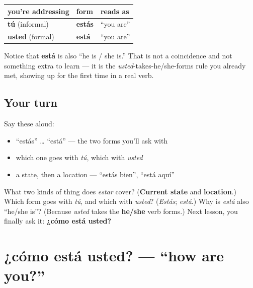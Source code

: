 \begin{grammarlens}[title={Grammar Lens: the two forms you need}]
\noindent
\begin{tabularx}{\linewidth}{@{}>{\raggedright\arraybackslash}X>{\raggedright\arraybackslash}X>{\raggedright\arraybackslash}X@{}}
\toprule
\textbf{you're addressing} & \textbf{form} & \textbf{reads as} \\
\midrule
\textbf{tú} (informal) & \textbf{estás} & \textquotedblleft{}you are\textquotedblright{} \\
\textbf{usted} (formal) & \textbf{está} & \textquotedblleft{}you are\textquotedblright{} \\
\bottomrule
\end{tabularx}

Notice that \textbf{está} is also \textquotedblleft{}he is / she is.\textquotedblright{} That is not a coincidence and not something extra to learn — it is the \emph{usted}-takes-he/she-forms rule you already met, showing up for the first time in a real verb.
\end{grammarlens}

\subsection*{Your turn}
Say these aloud:

\begin{itemize}
\raggedright
  \item \textquotedblleft{}estás\textquotedblright{} … \textquotedblleft{}está\textquotedblright{} — the two forms you'll ask with
  \item which one goes with \emph{tú}, which with \emph{usted}
  \item a state, then a location — \textquotedblleft{}estás bien\textquotedblright{}, \textquotedblleft{}está aquí\textquotedblright{}
\end{itemize}

\begin{tcolorbox}[breakable,colback=teal!4,colframe=teal!35!black,title={Before you move on}]
What two kinds of thing does \emph{estar} cover? (\textbf{Current state} and \textbf{location}.) Which form goes with \emph{tú}, and which with \emph{usted}? (\emph{Estás}; \emph{está}.) Why is \emph{está} also \textquotedblleft{}he/she is\textquotedblright{}? (Because \emph{usted} takes the \textbf{he/she} verb forms.) Next lesson, you finally ask it: \textbf{¿cómo está usted?}
\end{tcolorbox}
\section[¿cómo está usted?]{¿cómo está usted? — \textquotedblleft{}how are you?\textquotedblright{}}

